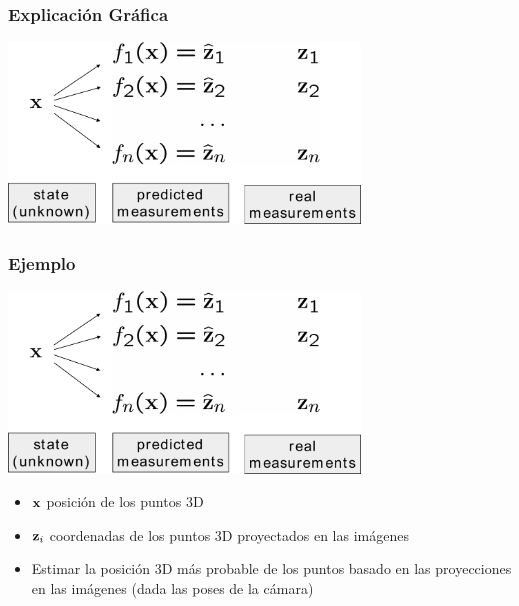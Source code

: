 \begin{frame}
    \frametitle{Explicación Gráfica}
    
    \begin{center}
        \includegraphics[width=0.7\textwidth]{images/least_squares.pdf}
    \end{center}

\end{frame}

\begin{frame}
    \frametitle{Ejemplo}
    
    \begin{center}
        \includegraphics[width=0.7\textwidth]{images/least_squares.pdf}
    \end{center}
    
    \begin{itemize}
        \item $\boldsymbol{\mathbf{x}}$ posición de los puntos 3D
        \item $\boldsymbol{\mathbf{z}}_{i}$ coordenadas de los puntos 3D proyectados en las imágenes
        \item Estimar la posición 3D más probable de los puntos basado en las proyecciones en las imágenes (dada las poses de la cámara)
    \end{itemize}
\end{frame}

